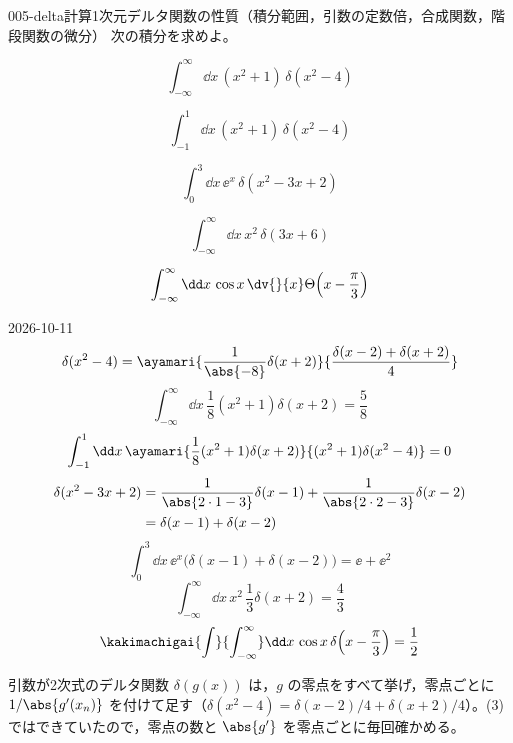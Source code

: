 \documentclass[uplatex,dvipdfmx,a4paper,11pt]{jsarticle}
\begin{document}
\begin{mondai}{005-delta}{計算}{1次元デルタ関数の性質（積分範囲，引数の定数倍，合成関数，階段関数の微分）}
次の積分を求めよ。
  \begin{shoumon}
    \item \[ \int_{-\infty}^{\infty}\dd x\,(x^2 + 1)\,\delta(x^2 - 4) \]
    \item \[ \int_{-1}^{1}\dd x\,(x^2 + 1)\,\delta(x^2 - 4) \]
    \item \[ \int_{0}^{3}\dd x\,\ee^{x}\,\delta(x^2 - 3x + 2) \]
    \item \[ \int_{-\infty}^{\infty}\dd x\,x^2\,\delta(3x + 6) \]
    \item \[ \int_{-\infty}^{\infty}\dd x\,\cos x\,\dv{}{x}\Theta\!\left(x - \frac{\pi}{3}\right) \]
  \end{shoumon}
\begin{kotaeutsushi}{2026-10-11}
\[ \delta(x^{2}-4)=\ayamari{\frac{1}{\abs{-8}}\delta(x+2)}{\frac{\delta(x-2)+\delta(x+2)}{4}} \]
\[ \int_{-\infty}^{\infty}\dd x\,\frac{1}{8}(x^{2}+1)\delta(x+2)=\frac{5}{8} \]
\[ \int_{-1}^{1}\dd x\,\ayamari{\frac{1}{8}(x^{2}+1)\delta(x+2)}{(x^{2}+1)\delta(x^{2}-4)}=0 \]
\begin{align*}
\delta(x^{2}-3x+2)&=\frac{1}{\abs{2\cdot1-3}}\delta(x-1)+\frac{1}{\abs{2\cdot2-3}}\delta(x-2)\\
&=\delta(x-1)+\delta(x-2)
\end{align*}
\[ \int_{0}^{3}\dd x\,\ee^{x}\bigl(\delta(x-1)+\delta(x-2)\bigr)=\ee+\ee^{2} \]
\[ \int_{-\infty}^{\infty}\dd x\,x^{2}\,\frac{1}{3}\delta(x+2)=\frac{4}{3} \]
\[ \kakimachigai{\int}{\int_{-\infty}^{\infty}}\dd x\,\cos x\,\delta\Bigl(x-\frac{\pi}{3}\Bigr)=\frac{1}{2} \]
\end{kotaeutsushi}
\begin{kizuki}
\item 引数が2次式のデルタ関数 $\delta(g(x))$ は，$g$ の零点をすべて挙げ，零点ごとに $1/\abs{g'(x_{n})}$ を付けて足す（$\delta(x^{2}-4)=\delta(x-2)/4+\delta(x+2)/4$）。(3) ではできていたので，零点の数と $\abs{g'}$ を零点ごとに毎回確かめる。

\end{kizuki}
\end{mondai}
\end{document}
